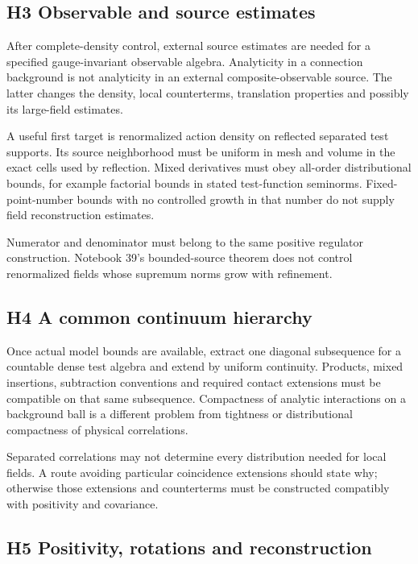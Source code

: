 \documentclass[11pt]{article}
\theoremstyle{remark}
\begin{document}
\subsection{H3 Observable and source estimates}

After complete-density control, external source
estimates are needed for a specified gauge-invariant
observable algebra. Analyticity in a connection
background is not analyticity in an external
composite-observable source. The latter changes the
density, local counterterms, translation properties
and possibly its large-field estimates.

A useful first target is renormalized action density
on reflected separated test supports. Its source
neighborhood must be uniform in mesh and volume
in the exact cells used by reflection. Mixed
derivatives must obey all-order distributional
bounds, for example factorial bounds in stated
test-function seminorms. Fixed-point-number bounds
with no controlled growth in that number do not
supply field reconstruction estimates.

Numerator and denominator must belong to the same
positive regulator construction. Notebook 39's
bounded-source theorem does not control renormalized
fields whose supremum norms grow with refinement.

\subsection{H4 A common continuum hierarchy}

Once actual model bounds are available, extract one
diagonal subsequence for a countable dense test
algebra and extend by uniform continuity. Products,
mixed insertions, subtraction conventions and
required contact extensions must be compatible
on that same subsequence. Compactness of analytic
interactions on a background ball is a different
problem from tightness or distributional
compactness of physical correlations.

Separated correlations may not determine every
distribution needed for local fields. A route
avoiding particular coincidence extensions should
state why; otherwise those extensions and
counterterms must be constructed compatibly with
positivity and covariance.

\subsection{H5 Positivity, rotations and reconstruction}
\end{document}
